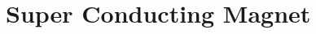 \documentclass[11pt,twoside,notitlepage]{book}
\begin{document}
\frontmatter

\pagestyle{fancy}

\mainmatter

\setcounter{chapter}{1}
\setcounter{page}{1}

\chapter{Super Conducting Magnet}





\end{document}
